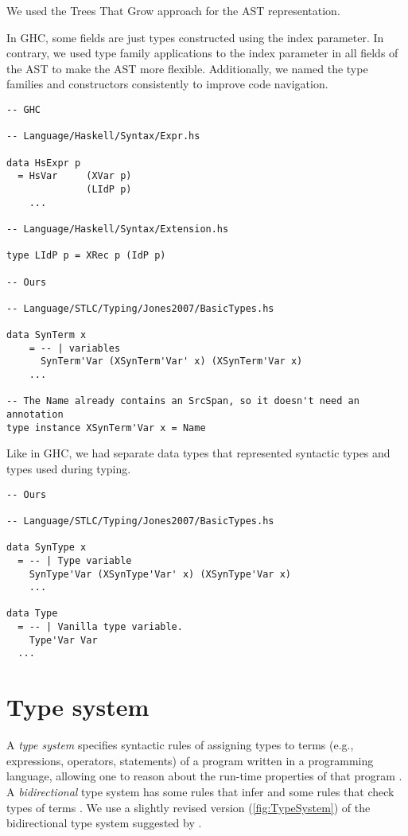 We used the Trees That Grow approach \cite{trees-that-grow-2016} for the AST representation.

In GHC, some fields are just types constructed using the index parameter. In contrary, we used type family applications to the index parameter in all fields of the AST to make the AST more flexible. Additionally, we named the type families and constructors consistently to improve code navigation.

\begin{verbatim}
-- GHC

-- Language/Haskell/Syntax/Expr.hs

data HsExpr p
  = HsVar     (XVar p)
              (LIdP p)
    ...

-- Language/Haskell/Syntax/Extension.hs

type LIdP p = XRec p (IdP p)

-- Ours

-- Language/STLC/Typing/Jones2007/BasicTypes.hs

data SynTerm x
    = -- | variables
      SynTerm'Var (XSynTerm'Var' x) (XSynTerm'Var x)
    ...

-- The Name already contains an SrcSpan, so it doesn't need an annotation
type instance XSynTerm'Var x = Name
\end{verbatim}

Like in GHC, we had separate data types that represented syntactic types and types used during typing.

\begin{verbatim}
-- Ours

-- Language/STLC/Typing/Jones2007/BasicTypes.hs

data SynType x
  = -- | Type variable
    SynType'Var (XSynType'Var' x) (XSynType'Var x)
    ...

data Type
  = -- | Vanilla type variable.
    Type'Var Var
  ...
\end{verbatim}

\section{Type system}

A \textit{type system} specifies syntactic rules of assigning types to terms (e.g., expressions, operators, statements) of a program written in a programming language, allowing one to reason about the run-time properties of that program \cite{pierce-types-2002}.
A \textit{bidirectional} type system has some rules that infer and some rules that check types of terms \cite{dunfield-bidirectional-2020}.
We use a slightly revised version (\cref{fig:TypeSystem}) of the bidirectional type system suggested by \citeauthor{jones-practical-2007} \cite[Sec. 4.7]{jones-practical-2007}.

